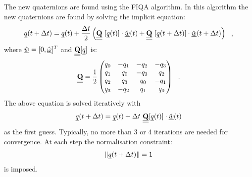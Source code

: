 The new quaternions are found using the FIQA algorithm.
In this algorithm the new quaternions are found by solving the implicit equation:
\begin{equation}
\mbox{$\underline{q}$}(t+\Delta t) = \mbox{$\underline{q}$}(t) + {\Delta t\over 2}
\left( \mbox{$\underline{\underline{\bf Q}}$}~[\mbox{$\underline{q}$}(t)] \cdot \hat{\mbox{$\underline{w}$}}(t) +
\mbox{$\underline{\underline{\bf Q}}$}~[\mbox{$\underline{q}$}(t+\Delta t)] \cdot \hat{\mbox{$\underline{w}$}}(t+\Delta t)\right)~~,
\end{equation}
where $\hat{\mbox{$\underline{w}$}} = [ 0,\hat{\mbox{$\underline{\omega}$}}]^T$ and $\mbox{$\underline{\underline{\bf Q}}$}[\mbox{$\underline{q}$}]$ is:
\begin{equation}
\mbox{$\underline{\underline{\bf Q}}$} = {1 \over 2}
\begin{pmatrix}
q_0 & -q_1 & -q_2 & -q_3 \cr
q_1 & ~q_0 & -q_3 & ~q_2 \cr
q_2 & ~q_3 & ~q_0 & -q_1 \cr
q_3 & -q_2 & ~q_1 & ~q_0
\end{pmatrix}~~.
\end{equation}
The above equation is solved iteratively with
\begin{equation}
{\mbox{$\underline{q}$}}(t+\Delta t) = {\mbox{$\underline{q}$}}(t) + \Delta t~\mbox{$\underline{\underline{\bf Q}}$}[{\mbox{$\underline{q}$}}(t)] \cdot \hat{\mbox{$\underline{w}$}}(t)
\end{equation}
as the first guess.  Typically, no more than 3 or 4 iterations are needed for convergence.
At each step the normalisation constraint:
\begin{equation}
\| \mbox{$\underline{q}$}(t+\Delta t) \| = 1
\end{equation}
is imposed.

